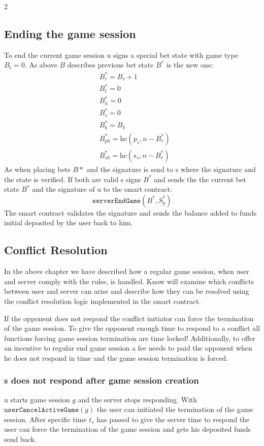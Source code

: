 \documentclass[oneside]{amsart}
\begin{document}
\begin{multicols}{2}
\subsection{Ending the game session}\label{subsec:endGameSession}
To end the current game session \gls{u} signs a special bet state with game type $B_t = 0$.
As above $B$ describes
previous bet state $B^*$ is the new one:
\begin{align}
    &B^*_r = B_r + 1 \\
    &B^*_t = 0 \\
    &B^*_n = 0 \\
    &B^*_v = 0 \\
    &B^*_b = B_b  \\
    &B^*_{ph} = \text{hc}(p_s, n - B^*_r) \\
    &B^*_{sh} = \text{hc}(s_s, n - B^*_r)
\end{align}
As when placing bets $B*$ and the signature is send to \gls{s} where the signature and the state is verified.
If both are valid \gls{s} signs $B^*$ and sends the the current bet state  $B^*$ and the signature of
\gls{u} to the smart contract:
\begin{equation}
    \texttt{serverEndGame}(B^*, S_p^*)
\end{equation}
The smart contract validates the signature and sends the balance added to funds initial deposited by the user back to him.

\subsection{Conflict Resolution}\label{subsec:conflictResolution}
In the above chapter we have described how a regular game session, when user and server comply with the rules, is handled.
Know will examine which conflicts between user and server can arise and describe how
they can be resolved using the conflict resolution logic implemented in the smart contract.

If the opponent does not respond the conflict initiator can force the termination of the game session.
To give the opponent enough time to respond to a conflict all functions forcing game session termination are
time locked!
Additionally, to offer an incentive to regular end game session a fee needs to paid the opponent when he does not respond in time and
the game session termination is forced.

\subsubsection{\Gls{s} does not respond after game session creation}
\Gls{u} starts game session $g$ and the server stops responding.
With $\texttt{userCancelActiveGame}(g)$ the user can initiated the termination of the game session.
After specific time $t_s$ has passed to give the server time to respond the user can force the termination
of the game session and gets his deposited funds send back.


\end{multicols}
\end{document}

